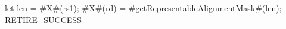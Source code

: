 let len = #\hyperref[sailRISCVzX]{X}#(rs1);
#\hyperref[sailRISCVzX]{X}#(rd) = #\hyperref[sailRISCVzgetRepresentableAlignmentMask]{getRepresentableAlignmentMask}#(len);
RETIRE_SUCCESS
